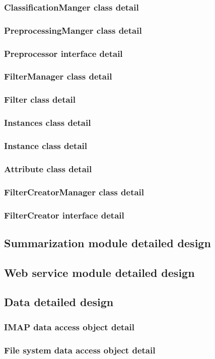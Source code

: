 \documentclass[12pt]{article}
\begin{document}
\subsubsection{ClassificationManger class detail}
\subsubsection{PreprocessingManger class detail}
\subsubsection{Preprocessor interface detail}
\subsubsection{FilterManager class detail}
\subsubsection{Filter class detail}
\subsubsection{Instances class detail}
\subsubsection{Instance class detail}
\subsubsection{Attribute class detail}
\subsubsection{FilterCreatorManager class detail}
\subsubsection{FilterCreator interface detail}

\subsection{Summarization module detailed design}
\subsection{Web service module detailed design}
\subsection{Data detailed design}
\subsubsection{IMAP data access object detail}
\subsubsection{File system data access object detail}
\end{document}
